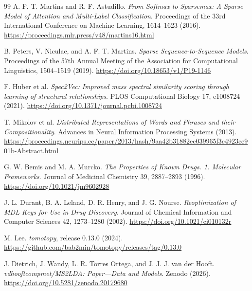 \documentclass[10pt,a4paper]{article}
\begin{document}
\begin{thebibliography}{99}
A. F. T. Martins and R. F. Astudillo. \emph{From Softmax to Sparsemax: A Sparse
Model of Attention and Multi-Label Classification}. Proceedings of the 33rd
International Conference on Machine Learning, 1614--1623 (2016).
\url{https://proceedings.mlr.press/v48/martins16.html}

B. Peters, V. Niculae, and A. F. T. Martins. \emph{Sparse
Sequence-to-Sequence Models}. Proceedings of the 57th Annual Meeting of the
Association for Computational Linguistics, 1504--1519 (2019).
\url{https://doi.org/10.18653/v1/P19-1146}

F. Huber et al. \emph{Spec2Vec: Improved mass spectral similarity scoring
through learning of structural relationships}. PLOS Computational Biology 17,
e1008724 (2021).
\url{https://doi.org/10.1371/journal.pcbi.1008724}

T. Mikolov et al. \emph{Distributed Representations of Words and Phrases and
their Compositionality}. Advances in Neural Information Processing Systems
(2013).
\url{https://proceedings.neurips.cc/paper/2013/hash/9aa42b31882ec039965f3c4923ce901b-Abstract.html}

G. W. Bemis and M. A. Murcko. \emph{The Properties of Known Drugs. 1.
Molecular Frameworks}. Journal of Medicinal Chemistry 39, 2887--2893 (1996).
\url{https://doi.org/10.1021/jm9602928}

J. L. Durant, B. A. Leland, D. R. Henry, and J. G. Nourse.
\emph{Reoptimization of MDL Keys for Use in Drug Discovery}.
Journal of Chemical Information and Computer Sciences 42,
1273--1280 (2002).
\url{https://doi.org/10.1021/ci010132r}

M. Lee. \emph{tomotopy}, release 0.13.0 (2024).
\url{https://github.com/bab2min/tomotopy/releases/tag/0.13.0}

J. Dietrich, J. Wandy, L. R. Torres Ortega, and J. J. J. van der Hooft.
\emph{vdhooftcompmet/MS2LDA: Paper---Data and Models}. Zenodo (2026).
\url{https://doi.org/10.5281/zenodo.20179680}

\end{thebibliography}
\end{document}
